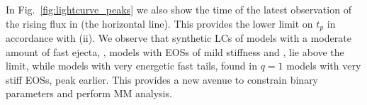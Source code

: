 In Fig.~\ref{fig:lightcurve_peaks} we also show the time of the latest observation 
of the rising flux in \GRB{} (the horizontal line). This provides the lower limit on $t_p$
in accordance with (ii).
%
We observe that synthetic \acp{LC} of models with a 
moderate amount of fast ejecta, \eg, models with 
\acp{EOS} of mild stiffness and \mr{}, lie above the limit, while models with very 
energetic fast tails, found in $q=1$ models with very stiff \acp{EOS}, peak earlier. 
This provides a new avenue to constrain binary parameters and perform \ac{MM} analysis.

